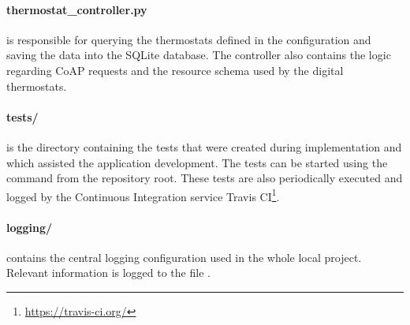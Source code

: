 \paragraph{thermostat\_controller.py} is responsible for querying the thermostats defined in the configuration and saving the data into the SQLite database.
The controller also contains the logic regarding CoAP requests and the resource schema used by the digital thermostats.

\paragraph{tests/} is the directory containing the tests that were created during implementation and which assisted the application development.
The tests can be started using the command  from the repository root.
These tests are also periodically executed and logged by the Continuous Integration service Travis CI\footnote{\url{https://travis-ci.org/}}.

\paragraph{logging/} contains the central logging configuration used in the whole local project.
Relevant information is logged to the file .






